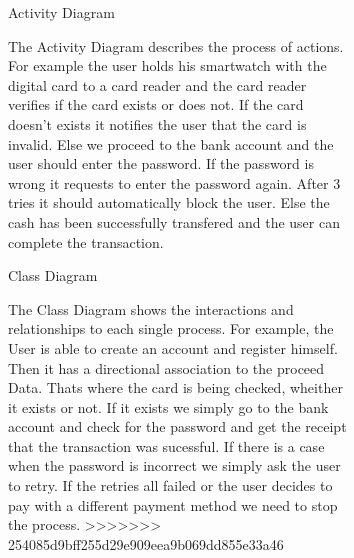 \documentclass{article}
\begin{document}
	\begin{figure}[htbp]
		\centering
		\begin{subfigure}{\textwidth}
			\resizebox{\textwidth}{!}{}
			\caption{Activity Diagram}
		\end{subfigure}
		\begin{subfigure}{\textwidth}
			The Activity Diagram describes the process of actions. For example the user holds his smartwatch with the digital card
			to a card reader and the card reader verifies if the card exists or does not. If the card doesn't exists it notifies
			the user that the card is invalid. Else we proceed to the bank account and the user should enter the password. If the 
			password is wrong it requests to enter the password again. After 3 tries it should automatically block the user. Else the 
			cash has been successfully transfered and the user can complete the transaction. 
		\end{subfigure}
	\end{figure}


	\begin{figure}[htbp]
		\centering
		\begin{subfigure}{\textwidth}
			\resizebox{\textwidth}{!}{}
			\caption{Class Diagram}
		\end{subfigure}
		\begin{subfigure}{\textwidth}
			The Class Diagram shows the interactions and relationships to each single process. For example, the User is
			able to create an account and register himself. Then it has a directional association to the proceed Data. Thats
			where the card is being checked, wheither it exists or not. If it exists we simply go to the bank account and check 
			for the password and get the receipt that the transaction was sucessful. If there is a case when the password is 
			incorrect we simply ask the user to retry. If the retries all failed or the user decides to pay with a different 
			payment method we need to stop the process. 
>>>>>>> 254085d9bff255d29e909eea9b069dd855e33a46
		\end{subfigure}
	\end{figure}
	\newpage
\end{document}
